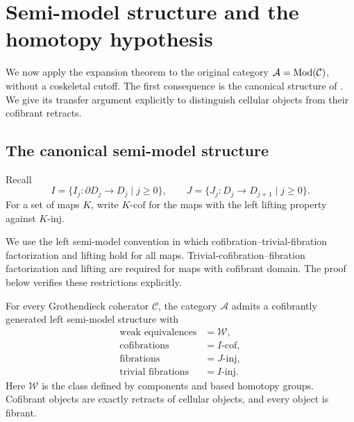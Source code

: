 \section{Semi-model structure and the homotopy hypothesis}
\label{sec:consequences}

We now apply the expansion theorem to the original category
\(\mathcal A=\operatorname{Mod}(\mathcal C)\), without a coskeletal cutoff.
The first consequence is the canonical structure of
\cite[Theorem~5.3.5]{Henry2016}.  We give its transfer argument explicitly
to distinguish cellular objects from their cofibrant retracts.

\subsection{The canonical semi-model structure}

Recall
\[
 I=\{I_j:\partial D_j\longrightarrow D_j\mid j\ge0\},
 \qquad
 J=\{J_j:D_j\longrightarrow D_{j+1}\mid j\ge0\}.
\]
For a set of maps \(K\), write \(K\text{-}\mathrm{cof}\)
for the maps with the left lifting property
against \(K\text{-}\mathrm{inj}\).

We use the left semi-model convention in which
cofibration--trivial-fibration factorization and lifting hold for all maps.
Trivial-cofibration--fibration factorization and lifting are required for maps
with cofibrant domain.  The proof below verifies these restrictions
explicitly.

\begin{corollary}\label{cor:semimodel}
For every Grothendieck coherator \(\mathcal C\), the category
\(\mathcal A\) admits a cofibrantly generated left semi-model structure
with
\[
 \begin{aligned}
  \text{weak equivalences}&=\mathcal W,\\
  \text{cofibrations}&=I\text{-}\mathrm{cof},\\
  \text{fibrations}&=J\text{-}\mathrm{inj},\\
  \text{trivial fibrations}&=I\text{-}\mathrm{inj}.
 \end{aligned}
\]
Here \(\mathcal W\) is the class defined by components and based
homotopy groups.  Cofibrant objects are exactly retracts of cellular
objects, and every object is fibrant.
\end{corollary}

